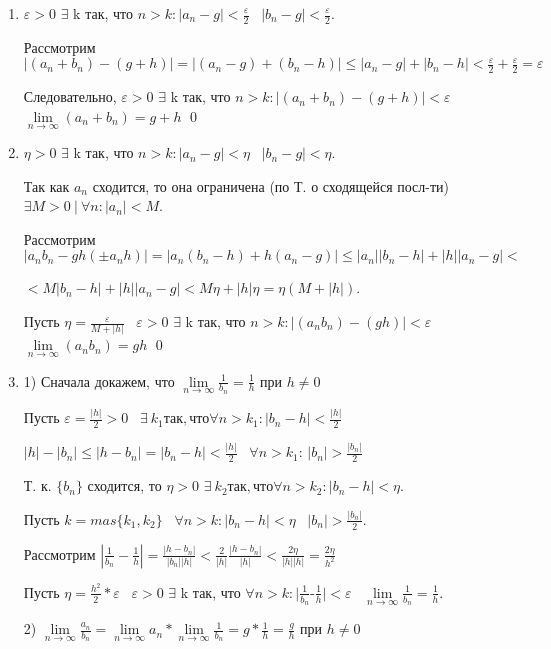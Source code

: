 \documentclass{article}
\begin{document}
\begin{enumerate}

\item \proof

\forall $\varepsilon>0$ $\exists$ k так, что \forall $n>k: |a_n-g|<\frac{\varepsilon}{2}$ \bigwedge \ $|b_n-g|<\frac{\varepsilon}{2}$.

Рассмотрим $|(a_n+b_n)-(g+h)|=|(a_n-g)+(b_n-h)|\leq |a_n-g|+|b_n-h|<\frac{\varepsilon}{2}+\frac{\varepsilon}{2}=\varepsilon$

Следовательно, \forall $\varepsilon>0$ $\exists$ k так, что \forall $n>k: |(a_n+b_n)-(g+h)|<\varepsilon$ \Rightarrow $\lim\limits_{n\to\infty}{(a_n+b_n)}=g+h$ \qed

\item \proof

\forall $\eta>0$ $\exists$ k так, что \forall $n>k: |a_n-g|<\eta$ \bigwedge \ $|b_n-g|<\eta$.

Так как ${a_n}$ сходится, то она ограничена (по Т. о сходящейся посл-ти) \Rightarrow\ $\exists M>0 \ | \ \forall n: |a_n|< M$.

Рассмотрим $|a_nb_n-gh(\pm a_nh)|=|a_n(b_n-h)+h(a_n-g)|\leq |a_n||b_n-h|+|h||a_n-g|<$

$<M|b_n-h|+|h||a_n-g|<M\eta + |h|\eta =\eta (M+|h|)$.

Пусть $\eta = \frac{\varepsilon}{M+|h|}$ \Rightarrow \ \forall $\varepsilon>0$ $\exists$ k так, что \forall $n>k: |(a_nb_n)-(gh)|<\varepsilon$ \Rightarrow $\lim\limits_{n\to\infty}{(a_nb_n)}=gh$ \qed 

\item \proof

1) Сначала докажем, что $\lim\limits_{n\to\infty}{\frac{1}{b_n}}=\frac{1}{h}$ при $h \neq 0$

Пусть $\varepsilon=\frac{|h|}{2}>0$ \Rightarrow \ $\exists\ k_1 так, что \forall n>k_1: |b_n-h|<\frac{|h|}{2}$

$|h|-|b_n|\leq |h-b_n|=|b_n-h|<\frac{|h|}{2}$ \Rightarrow \ $\forall n>k_1$: $|b_n|>\frac{|b_n|}{2}$

Т. к. $\{b_n\}$ сходится, то \forall $\eta>0$ $\exists\ k_2 так, что \forall n>k_2: |b_n-h|<\eta$.

Пусть $k=mas\{k_1, k_2\}$ \Rightarrow\ $\forall n>k: |b_n-h|<\eta$ \bigwedge\ $|b_n|>\frac{|b_n|}{2}$.

Рассмотрим $|\frac{1}{b_n}-\frac{1}{h}|=\frac{|h-b_n|}{|b_n||h|}<\frac{2}{|h|}\frac{|h-b_n|}{|h|}<\frac{2\eta}{|h||h|}=\frac{2\eta}{h^2}$
 
Пусть $\eta=\frac{h^2}{2}*\varepsilon$ \Rightarrow \ \forall $\varepsilon>0$ $\exists$ k так, что $\forall n>k: 
|\frac{1}{b_n}$-$\frac{1}{h}|$$<\varepsilon$ \Rightarrow\ $\lim\limits_{n\to\infty}{\frac{1}{b_n}}=\frac{1}{h}$.

2) $\lim\limits_{n\to\infty}{\frac{a_n}{b_n}}=\lim\limits_{n\to\infty}{a_n}*\lim\limits_{n\to\infty}{\frac{1}{b_n}}=g*\frac{1}{h}=\frac{g}{h}$ при $h \neq 0$

\end{enumerate}
\end{document}
